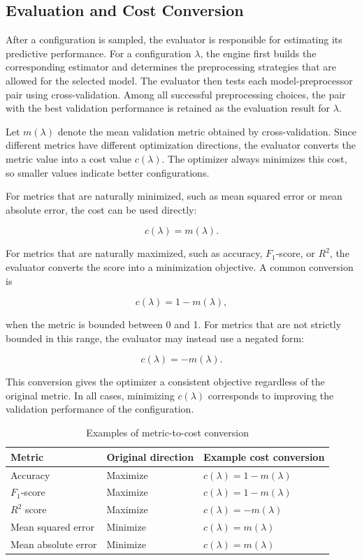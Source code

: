 \documentclass[12pt,a4paper,oneside]{report}
\begin{document}
\subsection{Evaluation and Cost Conversion}

After a configuration is sampled, the evaluator is responsible for estimating
its predictive performance. For a configuration \(\lambda\), the engine first
builds the corresponding estimator and determines the preprocessing strategies
that are allowed for the selected model. The evaluator then tests each
model-preprocessor pair using cross-validation. Among all successful
preprocessing choices, the pair with the best validation performance is retained
as the evaluation result for \(\lambda\).

\noindent Let \(m(\lambda)\) denote the mean validation metric obtained by
cross-validation. Since different metrics have different optimization
directions, the evaluator converts the metric value into a cost value
\(c(\lambda)\). The optimizer always minimizes this cost, so smaller values
indicate better configurations.

\noindent For metrics that are naturally minimized, such as mean squared error or mean
absolute error, the cost can be used directly:

\[
c(\lambda) = m(\lambda).
\]

\noindent For metrics that are naturally maximized, such as accuracy, \(F_1\)-score, or
\(R^2\), the evaluator converts the score into a minimization objective. A common
conversion is

\[
c(\lambda) = 1 - m(\lambda),
\]

\noindent when the metric is bounded between 0 and 1. For metrics that are not strictly
bounded in this range, the evaluator may instead use a negated form:

\[
c(\lambda) = -m(\lambda).
\]

\noindent This conversion gives the optimizer a consistent objective regardless of the
original metric. In all cases, minimizing \(c(\lambda)\) corresponds to improving
the validation performance of the configuration.

\begin{table}[H]
\centering
\caption{Examples of metric-to-cost conversion}
\label{tab:metric-cost-conversion}
\begin{tabular}{p{}p{}p{}}
\toprule
Metric & Original direction & Example cost conversion \\
\midrule
Accuracy & Maximize & \(c(\lambda) = 1 - m(\lambda)\) \\
\(F_1\)-score & Maximize & \(c(\lambda) = 1 - m(\lambda)\) \\
\(R^2\) score & Maximize & \(c(\lambda) = -m(\lambda)\) \\
Mean squared error & Minimize & \(c(\lambda) = m(\lambda)\) \\
Mean absolute error & Minimize & \(c(\lambda) = m(\lambda)\) \\
\bottomrule
\end{tabular}
\end{table}
\end{document}
